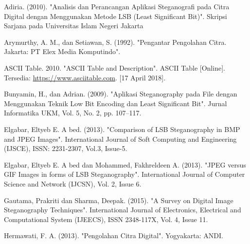 \documentclass{jtetiskripsi}
\begin{document}








%
\begin{thebibliography}{99}
	Adiria. (2010). "Analisis dan Perancangan Aplikasi Steganografi pada Citra Digital dengan Menggunakan Metode LSB (Least Significant Bit)". Skripsi Sarjana pada Universitas Islam Negeri Jakarta
	
	Arymurthy, A. M., dan Setiawan, S. (1992). "Pengantar Pengolahan Citra. Jakarta: PT Elex Media Komputindo".
	
	 ASCII Table.  2010. "ASCII Table and Description".  ASCII Table [Online]. Tersedia: \url{https://www.asciitable.com}. [17 April 2018].
	
	Bunyamin, H., dan Adrian. (2009). "Aplikasi Steganography pada File dengan Menggunakan Teknik Low Bit Encoding dan Least Significant Bit". Jurnal Informatika UKM, Vol. 5, No. 2, pp. 107–117.
	
	Elgabar, Eltyeb E. A bed. (2013). "Comparison of LSB Steganography in BMP and JPEG Images". International Journal of Soft Computing and Engineering (IJSCE), ISSN: 2231-2307, Vol.3, Issue-5.
	
	Elgabar, Eltyeb E. A bed dan Mohammed, Fakhreldeen A. (2013). "JPEG versus GIF Images in forms of LSB Steganography".  International Journal of Computer Science and Network (IJCSN), Vol. 2, Issue 6.
	
	Gautama, Prakriti dan Sharma, Deepak. (2015). "A Survey on Digital Image Steganography Techniques". International Journal of Electronics, Electrical and Computational System (IJEECS), ISSN 2348-117X, Vol. 4, Issue 11. 
	
	Hermawati, F. A. (2013). "Pengolahan Citra Digital". Yogyakarta: ANDI.
	

\end{thebibliography}
\end{document}
